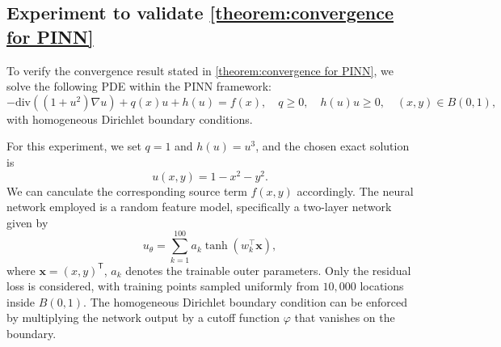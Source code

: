 \documentclass{article}
\newcommand{\T}{\mathsf{T}}
\begin{document}

\subsection{Experiment to validate \texorpdfstring{\cref{theorem:convergence for PINN}}{Theorem \ref{theorem:convergence for PINN}}}\label{sec:ex_interior}

To verify the convergence result stated in \cref{theorem:convergence for PINN}, we solve the following PDE within the PINN framework:
\begin{equation*}
    -\text{div}\left((1+u^2)\nabla u\right) + q(x)u + h(u) = f(x), 
    \quad q \geq 0, \quad h(u)u \geq 0, 
    \quad (x, y) \in B(0,1),
\end{equation*}
with homogeneous Dirichlet boundary conditions.

For this experiment, we set $q=1$ and $h(u)=u^3$, and the chosen exact solution is $$u(x,y) = 1 - x^2 - y^2.$$ 
We can canculate the corresponding source term $f(x,y)$ accordingly.
The neural network employed is a random feature model, specifically a two-layer network given by
\[
u_\theta = \sum_{k=1}^{100} a_k \tanh\left(w_k^\top \mathbf{x}\right),
\]
where $\mathbf{x}=(x,y)^\T$, $a_k$ denotes the trainable outer parameters. 
Only the residual loss is considered, with training points sampled uniformly from $10,000$ locations inside $B(0,1)$. 
The homogeneous Dirichlet boundary condition can be enforced by multiplying the network output by a cutoff function $\varphi$ that vanishes on the boundary.
\end{document}
